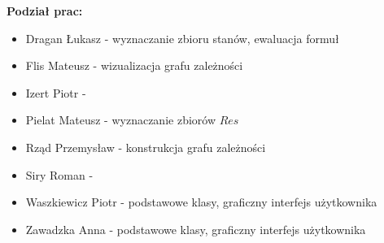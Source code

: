 \documentclass{article}
\begin{document}
\newpage
\textbf{Podział prac:}
\begin{itemize}
    \item Dragan Łukasz - wyznaczanie zbioru stanów, ewaluacja formuł
    \item Flis Mateusz - wizualizacja grafu zależności
    \item Izert Piotr - 
    \item Pielat Mateusz - wyznaczanie zbiorów $Res$
    \item Rząd Przemysław - konstrukcja grafu zależności
    \item Siry Roman - 
    \item Waszkiewicz Piotr - podstawowe klasy, graficzny interfejs użytkownika
    \item Zawadzka Anna - podstawowe klasy, graficzny interfejs użytkownika
\end{itemize}
\end{document}
